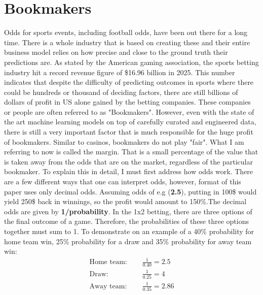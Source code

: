 \documentclass{article}
\begin{document}
\section{Bookmakers}
Odds for sports events, including football odds, have been out there for a long time. There is a whole industry that is based on creating these and their entire business model relies on how precise and close to the ground truth their predictions are. As stated by the American gaming association, the sports betting industry hit a record revenue figure of \$16.96 billion in 2025\cite{Revenue}. This number indicates that despite the difficulty of predicting outcomes in sports where there could be hundreds or thousand of deciding factors, there are still billions of dollars of profit in US alone gained by the betting companies. These companies or people are often referred to as "Bookmakers". However, even with the state of the art machine learning models on top of carefully curated and engineered data, there is still a very important factor that is much responsible for the huge profit of bookmakers. Similar to casinos, bookmakers do not play "fair". What I am referring to now is called the margin. That is a small percentage of the value that is taken away from the odds that are on the market, regardless of the particular bookmaker. To explain this in detail, I must first address how odds work. There are a few different ways that one can interpret odds, however, format of this paper uses only decimal odds. Assuming odds of e.g (\textbf{2.5}), putting in 100\$ would yield 250\$ back in winnings, so the profit would amount to 150\%.The decimal odds are given by \textbf{1/probability}. In the 1x2 betting, there are three options of the final outcome of a game. Therefore, the probabilities of these three options together must sum to 1. To demonstrate on an example of a 40\% probability for home team win, 25\% probability for a draw and 35\% probability for away team win:
\begin{align*}
\text{Home team: } & \quad \frac{1}{0.40} = 2.5 \\
\text{Draw: } & \quad \frac{1}{0.25} = 4 \\
\text{Away team: } & \quad \frac{1}{0.35} = 2.86
\end{align*}
\end{document}
